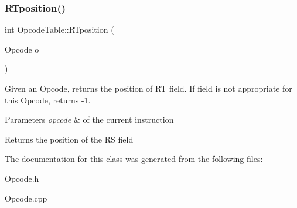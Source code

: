 \subsubsection{\texorpdfstring{R\+Tposition()}{RTposition()}}
{\footnotesize\ttfamily int Opcode\+Table\+::\+R\+Tposition (\begin{DoxyParamCaption}\item[{Opcode}]{o }\end{DoxyParamCaption})}

Given an Opcode, returns the position of RT field. If field is not appropriate for this Opcode, returns -\/1. 
\begin{DoxyParams}{Parameters}
{\em opcode} & of the current instruction \\
\hline
\end{DoxyParams}
\begin{DoxyReturn}{Returns}
the position of the RS field 
\end{DoxyReturn}


The documentation for this class was generated from the following files\+:\begin{DoxyCompactItemize}
\item 
Opcode.\+h\item 
Opcode.\+cpp\end{DoxyCompactItemize}
